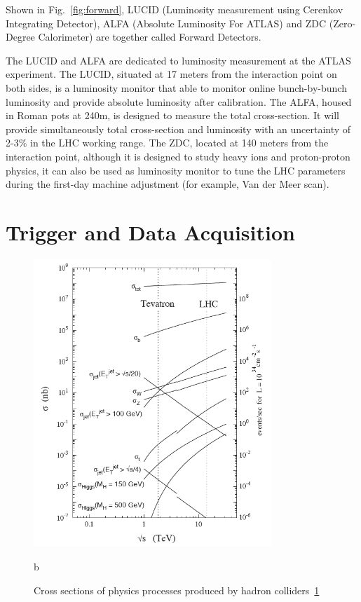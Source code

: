 \par Shown in Fig.~\ref{fig:forward}, LUCID (Luminosity measurement using Cerenkov Integrating Detector), ALFA (Absolute Luminosity For ATLAS) and ZDC (Zero-Degree Calorimeter) are together called Forward Detectors. 

\par The LUCID and ALFA are dedicated to luminosity measurement at the ATLAS experiment. The LUCID, situated at 17 meters from the interaction point on both sides, is a luminosity monitor that able to monitor online bunch-by-bunch luminosity and provide absolute luminosity after calibration. The ALFA, housed in Roman pots at 240m, is designed to measure the total cross-section. It will provide simultaneously total cross-section and luminosity with an uncertainty of 2-3\% in the LHC working range. The ZDC, located at 140 meters from the interaction point, although it is designed to study heavy ions and proton-proton physics, it can also be used as luminosity monitor to tune the LHC parameters during the first-day machine adjustment (for example, Van der Meer scan).

\section{Trigger and Data Acquisition}
\label{sec:data}

\begin{figure}[htbp!]
    \centering
    \includegraphics[width=0.8\textwidth]{chapters/c4/figures/cross}
    \caption{b}
    \label{fig:cross}
    \caption{Cross sections of physics processes produced by hadron colliders~\ref{fig:cross}}
\end{figure}

